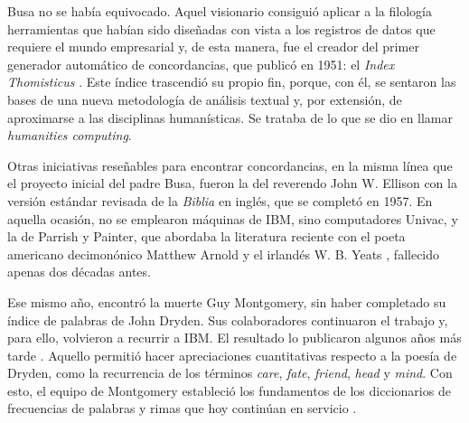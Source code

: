 Busa no se había equivocado. Aquel visionario consiguió aplicar a la filología herramientas que habían sido diseñadas con vista a los registros de datos que requiere el mundo empresarial y, de esta manera, fue el creador del primer generador automático de concordancias, que publicó en 1951: el \textit{Index Thomisticus} \parencite{busa1951}. Este índice trascendió su propio fin, porque, con él, se sentaron las bases de una nueva metodología de análisis textual y, por extensión, de aproximarse a las disciplinas humanísticas. Se trataba de lo que se dio en llamar \textit{humanities computing}.

Otras iniciativas reseñables para encontrar concordancias, en la misma línea que el proyecto inicial del padre Busa, fueron la del reverendo John W. Ellison con la versión estándar revisada de la \textit{Biblia} en inglés, que se completó en 1957. En aquella ocasión, no se emplearon máquinas de IBM, sino computadores Univac, y la de Parrish y Painter, que abordaba la literatura reciente con el poeta americano decimonónico Matthew Arnold y el irlandés W. B. Yeats \parencite[6-8]{burton1981}, fallecido apenas dos décadas antes.

Ese mismo año, encontró la muerte Guy Montgomery, sin haber completado su índice de palabras de John Dryden. Sus colaboradores continuaron el trabajo y, para ello, volvieron a recurrir a IBM. El resultado lo publicaron algunos años más tarde \parencite{montgomery1957}. Aquello permitió hacer apreciaciones cuantitativas respecto a la poesía de Dryden, como la recurrencia de los términos \textit{care}, \textit{fate}, \textit{friend}, \textit{head} y \textit{mind}. Con esto, el equipo de Montgomery estableció los fundamentos de los diccionarios de frecuencias de palabras y rimas que hoy continúan en servicio \parencite[4]{burton1981}.

